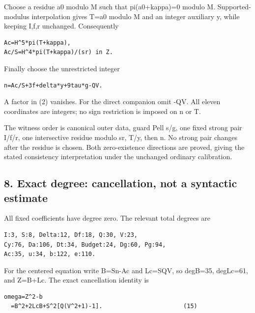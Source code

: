 Choose a residue a0 modulo M such that pi(a0+\allowbreak{}kappa)=\allowbreak{}0 modulo M. Supported-modulus interpolation gives T=\allowbreak{}a0 modulo M and an integer auxiliary y, while keeping I,f,r unchanged. Consequently



\begin{verbatim}
Ac=H^5*pi(T+kappa),
Ac/S=H^4*pi(T+kappa)/(sr) in Z.
\end{verbatim}

Finally choose the unrestricted integer



\begin{verbatim}
n=Ac/S+3f+delta*y+9tau*g-QV.
\end{verbatim}

A factor in (2) vanishes. For the direct companion omit -QV. All eleven coordinates are integers; no sign restriction is imposed on n or T.



The witness order is canonical outer data, guard Pell s/\allowbreak{}g, one fixed strong pair I/\allowbreak{}f/\allowbreak{}r, one intersective residue modulo sr, T/\allowbreak{}y, then n. No strong pair changes after the residue is chosen. Both zero-existence directions are proved, giving the stated consistency interpretation under the unchanged ordinary calibration.



\subsection*{8. Exact degree: cancellation, not a syntactic estimate}



All fixed coefficients have degree zero. The relevant total degrees are



\begin{verbatim}
I:3, S:8, Delta:12, Df:18, Q:30, V:23,
Cy:76, Da:106, Dt:34, Budget:24, Dg:60, Pg:94,
Ac:35, u:34, b:122, e:110.
\end{verbatim}

For the centered equation write B=\allowbreak{}Sn-Ac and Lc=\allowbreak{}SQV, so degB=\allowbreak{}35, degLc=\allowbreak{}61, and Z=\allowbreak{}B+\allowbreak{}Lc. The exact cancellation identity is



\begin{verbatim}
omega=Z^2-b
  =B^2+2LcB+S^2[Q(V^2+1)-1].                       (15)
\end{verbatim}

